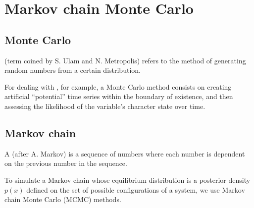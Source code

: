 \documentclass[a4paper,12pt,english]{sphinxhowto}
\begin{document}
\begin{quote}




{\hyperref[\detokenize{Time:edhrd}]{}}


\end{quote}




\section{Markov chain Monte Carlo}
\label{\detokenize{MCMC:markov-chain-monte-carlo}}\label{\detokenize{MCMC:mcmc}}\label{\detokenize{MCMC::doc}}

\subsection{Monte Carlo}
\label{\detokenize{MCMC:monte-carlo}}
 (term coined by S. Ulam and N. Metropolis) refers to the method of
generating random numbers from a certain distribution.

For dealing with {\hyperref[\detokenize{Uncertainty:uncertainty}]{}}, for example, a Monte Carlo method consists on
creating artificial “potential” time series within the boundary of existence, and then
assessing the likelihood of the variable’s character state over time.


\subsection{Markov chain}
\label{\detokenize{MCMC:markov-chain}}
A  (after A. Markov) is a sequence of numbers where each number is dependent on the previous
number in the sequence.

To simulate a Markov chain whose equilibrium distribution is a posterior density \(p(x)\) defined on
the set of possible configurations of a system, we use Markov chain Monte Carlo (MCMC) methods.
\end{document}
